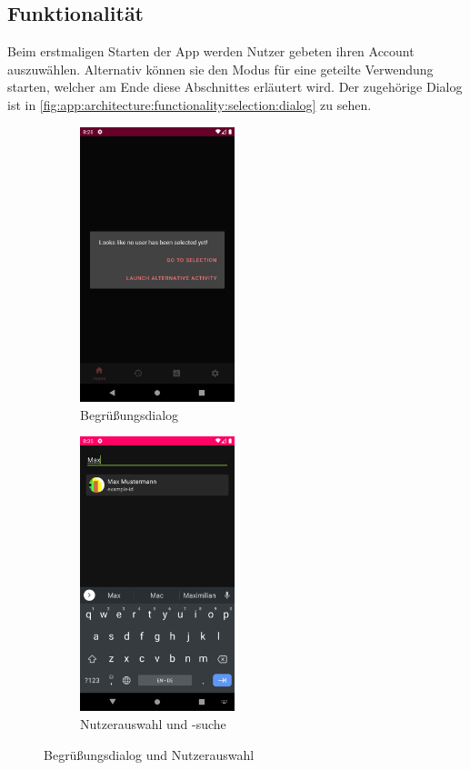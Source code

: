 \documentclass[a4paper, 11pt]{article}
\begin{document}
\subsection{Funktionalität}
\label{subsec:app:functionality}
Beim erstmaligen Starten der App werden Nutzer gebeten ihren Account auszuwählen.
Alternativ können sie den Modus für eine geteilte Verwendung starten, welcher am Ende diese Abschnittes erläutert wird.
Der zugehörige Dialog ist in \autoref{fig:app:architecture:functionality:selection:dialog} zu sehen.
\begin{figure}[]
	\begin{subfigure}{.5\textwidth}
		\centering
			\includegraphics[height=8cm,keepaspectratio]{./images/screenshots/greetings-dialog.png}
		\caption{Begrüßungsdialog}
		\label{fig:app:architecture:functionality:selection:dialog}
	\end{subfigure}
	\begin{subfigure}{.5\textwidth}
		\centering
		\includegraphics[height=8cm,keepaspectratio]{./images/screenshots/user-search.png}
		\caption{Nutzerauswahl und -suche}
		\label{fig:app:architecture:functionality:selection:search}
	\end{subfigure}
	\caption{Begrüßungsdialog und Nutzerauswahl}
	\label{fig:app:architecture:functionality:selection}
\end{figure}
\end{document}
